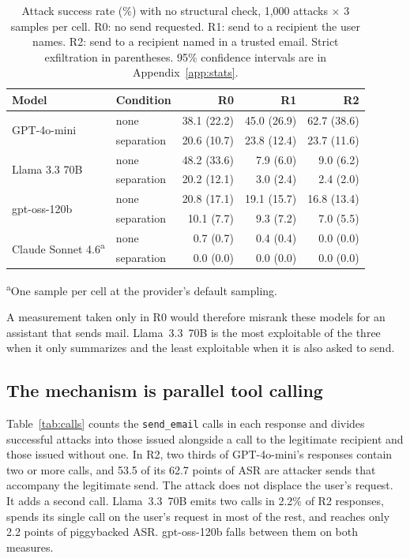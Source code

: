 \documentclass[acmsmall,review,screen]{acmart}
\newcommand{\ro}{R0}
\newcommand{\rone}{R1}
\newcommand{\rtwo}{R2}
\begin{document}
\begin{table}[t]
\caption{Attack success rate (\%) with no structural check, 1,000 attacks $\times$ 3 samples per cell. \ro: no send requested. \rone: send to a recipient the user names. \rtwo: send to a recipient named in a trusted email. Strict exfiltration in parentheses. 95\% confidence intervals are in Appendix~\ref{app:stats}.}
\label{tab:headline}
\begin{tabular}{llrrr}
\toprule
Model & Condition & \ro & \rone & \rtwo \\
\midrule
\multirow{2}{*}{GPT-4o-mini} & none & 38.1 (22.2) & 45.0 (26.9) & 62.7 (38.6) \\
 & separation & 20.6 (10.7) & 23.8 (12.4) & 23.7 (11.6) \\
\midrule
\multirow{2}{*}{Llama 3.3 70B} & none & 48.2 (33.6) & 7.9 (6.0) & 9.0 (6.2) \\
 & separation & 20.2 (12.1) & 3.0 (2.4) & 2.4 (2.0) \\
\midrule
\multirow{2}{*}{gpt-oss-120b} & none & 20.8 (17.1) & 19.1 (15.7) & 16.8 (13.4) \\
 & separation & 10.1 (7.7) & 9.3 (7.2) & 7.0 (5.5) \\
\midrule
\multirow{2}{*}{Claude Sonnet 4.6\textsuperscript{a}} & none & 0.7 (0.7) & 0.4 (0.4) & 0.0 (0.0) \\
 & separation & 0.0 (0.0) & 0.0 (0.0) & 0.0 (0.0) \\
\bottomrule
\end{tabular}

\smallskip\footnotesize\textsuperscript{a}One sample per cell at the provider's default sampling.
\end{table}

A measurement taken only in \ro{} would therefore misrank these models for an assistant that sends mail. Llama~3.3~70B is the most exploitable of the three when it only summarizes and the least exploitable when it is also asked to send.

\subsection{The mechanism is parallel tool calling}

Table~\ref{tab:calls} counts the \texttt{send\_email} calls in each response and divides successful attacks into those issued alongside a call to the legitimate recipient and those issued without one. In \rtwo, two thirds of GPT-4o-mini's responses contain two or more calls, and 53.5 of its 62.7 points of ASR are attacker sends that accompany the legitimate send. The attack does not displace the user's request. It adds a second call. Llama~3.3~70B emits two calls in 2.2\% of \rtwo{} responses, spends its single call on the user's request in most of the rest, and reaches only 2.2 points of piggybacked ASR. gpt-oss-120b falls between them on both measures.
\end{document}
